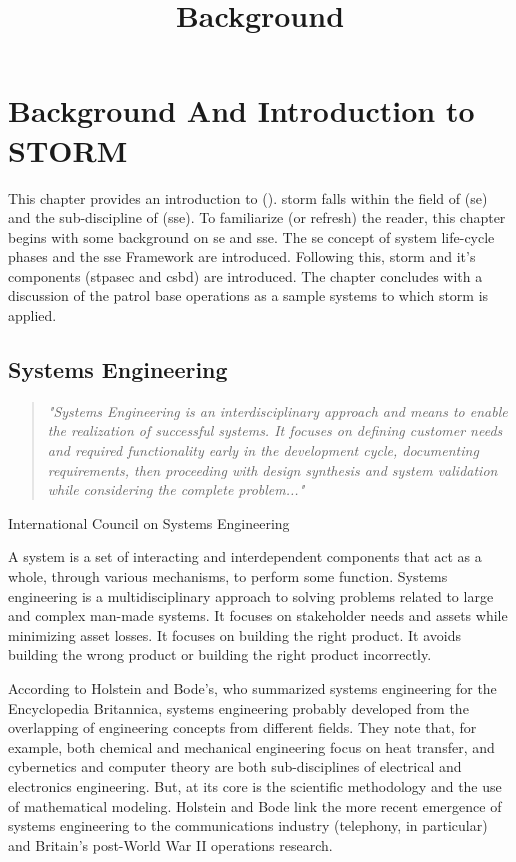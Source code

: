 \documentclass[../../main/main.tex]{subfiles}
\begin{document}
\title{Background}


\chapter{Background And Introduction to STORM}\label{chp:storm}
This chapter provides an introduction to  ().  \gls{storm} falls within the field of  (\gls{se}) and the sub-discipline of  (\gls{sse}). To familiarize (or refresh) the reader, this chapter begins with some background on \gls{se} and \gls{sse}.  The \gls{se} concept of system life-cycle phases and the \gls{sse} Framework are introduced.  Following this, \gls{storm} and it's components (\gls{stpasec} and \gls{csbd}) are introduced.  The chapter concludes with a discussion of the patrol base operations as a sample systems to which  \gls{storm} is applied.

\section{Systems Engineering}\label{sec:stormse}
\begin{quote}
\textit{"Systems Engineering is an interdisciplinary approach and means to enable the realization of successful systems. It focuses on defining customer needs and required functionality early in the development cycle, documenting requirements, then proceeding with design synthesis and system validation while considering the complete problem..."
}\end{quote}
\begin{flushright} International Council on Systems Engineering \end{flushright} 

A system is a set of interacting and interdependent components that act as a whole,  through various mechanisms, to perform some function. Systems engineering is a multidisciplinary approach to solving problems related to large and complex man-made systems.  It focuses on stakeholder needs and assets while minimizing asset losses.  It focuses on building the right product.  It avoids building the wrong product or building the right product incorrectly.  

According to Holstein and Bode's, who summarized systems engineering for the Encyclopedia Britannica, systems engineering probably developed from the overlapping of engineering concepts from different fields. They note that, for example, both chemical and mechanical engineering focus on heat transfer, and cybernetics and computer theory are both sub-disciplines of electrical and electronics engineering.   But, at its core is the scientific methodology and the use of mathematical modeling.  Holstein and Bode link the more recent emergence of systems engineering to the communications industry (telephony, in particular) and Britain's post-World War II operations research.
\end{document}
